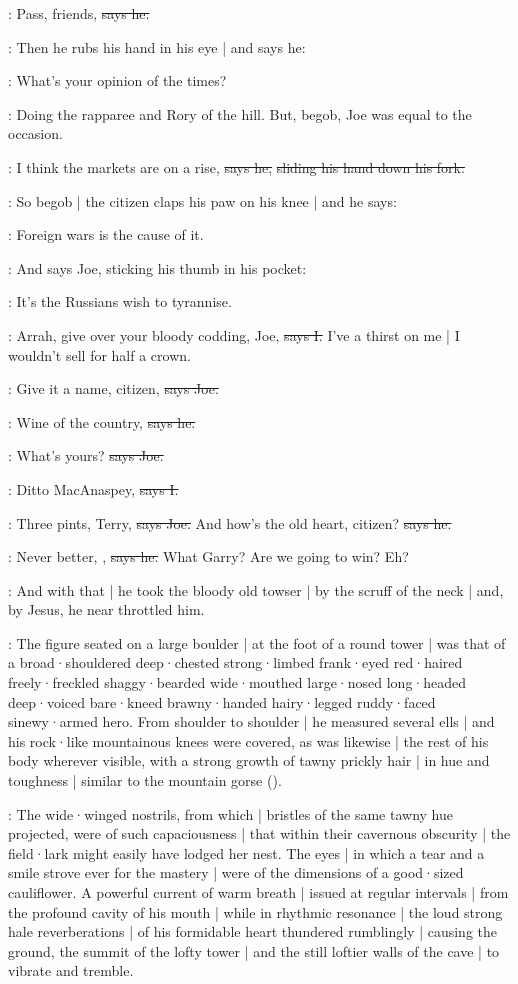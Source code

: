 \citizen:
Pass,
friends,
\sout{says he.}

\Nq:
Then he rubs his hand in his eye |
and says he:

\citizen:
What's your opinion of the times?

\Nq:
Doing the rapparee and Rory of the hill.
But,
begob,
Joe was equal to the occasion.

\joe:
I think the markets are on a rise,
\sout{says he,}
\sout{sliding his hand down his fork.}

\Nq:
So begob |
the citizen claps his paw on his knee |
and he says:

\citizen:
Foreign wars is the cause of it.

\Nq:
And says Joe,
sticking his thumb in his pocket:

\joe:
It's the Russians wish to tyrannise.

:
Arrah,
give over your bloody codding,
Joe,
\sout{says I.}
I've a thirst on me |
I wouldn't sell for half a crown.

\joe:
Give it a name,
citizen,
\sout{says Joe.}

\citizen:
Wine of the country,
\sout{says he.}

\joe:
What's yours?
\sout{says Joe.}

:
Ditto MacAnaspey,
\sout{says I.}

\joe:
Three pints,
Terry,
\sout{says Joe.}
And how's the old heart,
citizen?
\sout{says he.}

\citizen:
Never better,
,
\sout{says he.}
What Garry?
Are we going to win?
Eh?

\Nq:
And with that |
he took the bloody old towser |
by the scruff of the neck |
and,
by Jesus,
he near throttled him.

:
The figure seated on a large boulder |
at the foot of a round tower |
was that of
a broad·shouldered
deep·chested
strong·limbed
frank·eyed
red·haired
freely·freckled
shaggy·bearded
wide·mouthed
large·nosed
long·headed
deep·voiced
bare·kneed
brawny·handed
hairy·legged
ruddy·faced
sinewy·armed hero.
From shoulder to shoulder |
he measured several ells |
and his rock·like mountainous knees were covered,
as was likewise |
the rest of his body wherever visible,
with a strong growth of tawny prickly hair |
in hue and toughness |
similar to the mountain gorse
().

:
The wide·winged nostrils,
from which |
bristles of the same tawny hue projected,
were of such capaciousness
 |
that within their cavernous obscurity |
the field·lark might easily have lodged her nest.
The eyes |
in which a tear and a smile strove ever for the mastery |
were of the dimensions of a good·sized cauliflower.
A powerful current of warm breath |
issued at regular intervals |
from the profound cavity of his mouth |
while in rhythmic resonance |
the loud strong hale reverberations |
of his formidable heart thundered rumblingly |
causing the ground,
the summit of the lofty tower |
and the still loftier walls of the cave |
to vibrate and tremble.

